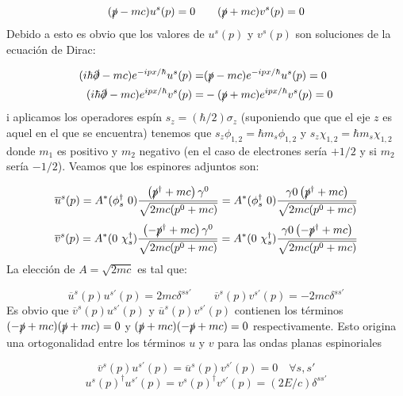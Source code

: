 \begin{equation}
	(\slashed{p}- mc) u^s(p)=0 \qquad (\slashed{p}+mc)v^s(p)=0
\end{equation}
Debido a esto es obvio que los valores de $u^s(p)$ y $v^s(p)$ son soluciones de la ecuación de Dirac:

\begin{equation}
	\begin{split}
	(i\hbar\slashed{\partial}-mc)e^{-ipx/\hbar} u^s(p) =&(\slashed{p}-mc)e^{-ipx/\hbar}u^s(p)=0 \\
	(i\hbar\slashed{\partial}-mc)e^{ipx/\hbar} v^s(p) =&-(\slashed{p}+mc)e^{ipx/\hbar}v^s(p)=0 
	\end{split}
\end{equation}i aplicamos los operadores espín $s_z = (\hbar/2) \sigma_z$ (suponiendo que que el eje $z$ es aquel en el que se encuentra) tenemos que $s_z \phi_{1,2} = \hbar m_s \phi_{1,2} $ y $s_z \chi_{1,2} = \hbar m_s \chi_{1,2}$ donde $m_1$ es positivo y $m_2$ negativo (en el caso de electrones sería $+1/2$ y si $m_2$ sería $-1/2$). Veamos que los espinores adjuntos son:

\begin{equation}
	\overline{u}^s(p) = A^* (\phi_s^\dagger  \ 0) \frac{\left( \slashed{p}^\dagger+mc \right)\gamma^0}{\sqrt{2mc(p^0+mc)}} =
	A^* (\phi_s^\dagger \ 0) \frac{\gamma0\left( \slashed{p}^\dagger+mc \right)}{\sqrt{2mc(p^0+mc)}} 
\end{equation}
\begin{equation}
	\overline{v}^s(p) = A^* (0 \ \chi_s^\dagger) \frac{\parentesis{-\pbar^\dagger+mc}\gamma^0}{\sqrt{2mc(p^0+mc)}} =
	A^* (0 \ \chi_s^\dagger) \frac{\gamma0\parentesis{-\pbar^\dagger+mc}}{\sqrt{2mc(p^0+mc)}} 
\end{equation}
La elección de $A=\sqrt{2mc}$ es tal que:

\begin{equation}
	\overline{u}^s(p) u^{s'}(p)= 2mc\delta^{ss'} \qquad 	\overline{v}^s(p) v^{s'}(p)=-2mc\delta^{ss'}
\end{equation}
Es obvio que $\overline{v}^s(p) u^{s'}(p)$ y $\overline{u}^s(p) v^{s'}(p)$ contienen los términos $(-\slashed{p}+mc)(\slashed{p}+mc)=0$ y $(\slashed{p}+mc)(-\slashed{p}+mc)=0$ respectivamente. Esto origina una ortogonalidad entre los términos $u$ y $v$ para las ondas planas espinoriales

\begin{equation}
	\overline{v}^s(p) u^{s'}(p) = \overline{u}^s(p) v^{s'}(p) = 0 \quad \forall s,s'
\end{equation}
\begin{equation}
	u^s(p)^\dagger u^{s'}(p) = v^s(p)^\dagger v^{s'}(p)= (2E/c)\delta^{ss'}
\end{equation}

